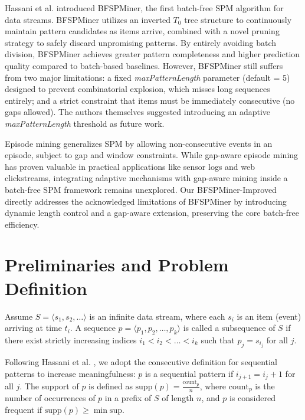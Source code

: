 \documentclass[conference]{IEEEtran}
\begin{document}
Hassani et al. \cite{hassani2019} introduced BFSPMiner, the first batch-free SPM algorithm for data streams. BFSPMiner utilizes an inverted $T_0$ tree structure to continuously maintain pattern candidates as items arrive, combined with a novel pruning strategy to safely discard unpromising patterns. By entirely avoiding batch division, BFSPMiner achieves greater pattern completeness and higher prediction quality compared to batch-based baselines. However, BFSPMiner still suffers from two major limitations: a fixed \textit{maxPatternLength} parameter (default = 5) designed to prevent combinatorial explosion, which misses long sequences entirely; and a strict constraint that items must be immediately consecutive (no gaps allowed). The authors themselves suggested introducing an adaptive \textit{maxPatternLength} threshold as future work.

Episode mining generalizes SPM by allowing non-consecutive events in an episode, subject to gap and window constraints. While gap-aware episode mining has proven valuable in practical applications like sensor logs and web clickstreams, integrating adaptive mechanisms with gap-aware mining inside a batch-free SPM framework remains unexplored. Our BFSPMiner-Improved directly addresses the acknowledged limitations of BFSPMiner by introducing dynamic length control and a gap-aware extension, preserving the core batch-free efficiency.

\section{Preliminaries and Problem Definition}
\label{sec:preliminaries}

Assume $S = \langle s_1, s_2, \dots \rangle$ is an infinite data stream, where each $s_i$ is an item (event) arriving at time $t_i$. A sequence $p = \langle p_1, p_2, \dots, p_k \rangle$ is called a subsequence of $S$ if there exist strictly increasing indices $i_1 < i_2 < \dots < i_k$ such that $p_j = s_{i_j}$ for all $j$.

Following Hassani et al. \cite{hassani2019}, we adopt the consecutive definition for sequential patterns to increase meaningfulness: $p$ is a sequential pattern if $i_{j+1} = i_j + 1$ for all $j$. The support of $p$ is defined as $\text{supp}(p) = \frac{\text{count}_p}{n}$, where $\text{count}_p$ is the number of occurrences of $p$ in a prefix of $S$ of length $n$, and $p$ is considered frequent if $\text{supp}(p) \geq \min\text{sup}$.
\end{document}
